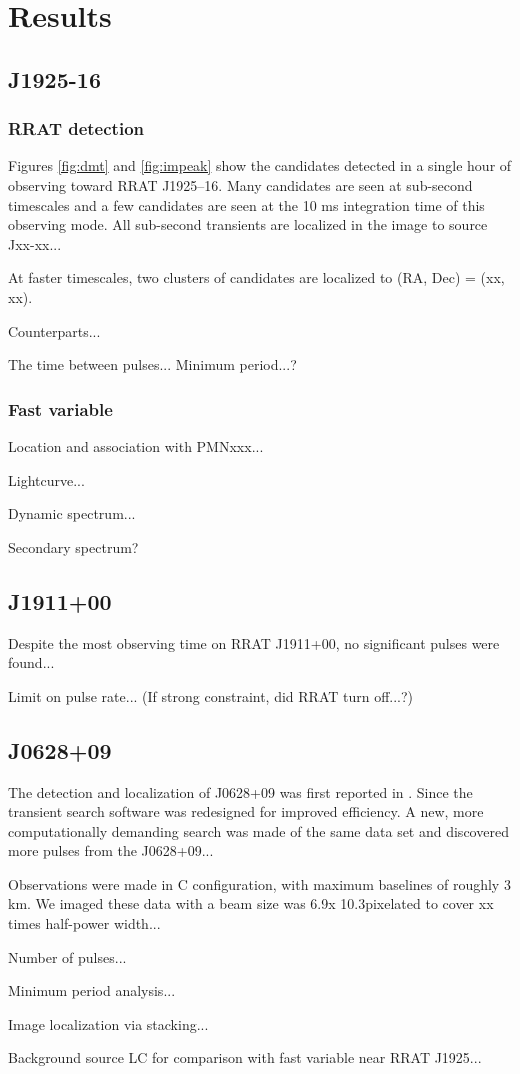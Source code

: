 \section{Results}

\subsection{J1925-16}
\subsubsection{RRAT detection}
\label{rrat1925}

Figures \ref{fig:dmt} and \ref{fig:impeak} show the candidates detected in a single hour of observing toward RRAT J1925--16. Many candidates are seen at sub-second timescales and a few candidates are seen at the 10 ms integration time of this observing mode. All sub-second transients are localized in the image to source Jxx-xx...

At faster timescales, two clusters of candidates are localized to (RA, Dec) = (xx, xx). 

Counterparts...

The time between pulses... Minimum period...?

\subsubsection{Fast variable}
\label{fast}

Location and association with PMNxxx...

Lightcurve...

Dynamic spectrum...

Secondary spectrum?

\subsection{J1911+00}

Despite the most observing time on RRAT J1911+00, no significant pulses were found...

Limit on pulse rate...
(If strong constraint, did RRAT turn off...?)

\subsection{J0628+09}

The detection and localization of J0628+09 was first reported in \cite{Law_2012}. Since the transient search software was redesigned for improved efficiency. A new, more computationally demanding search was made of the same data set and discovered more pulses from the J0628+09...

Observations were made in C configuration, with maximum baselines of roughly 3 km. We imaged these data with a beam size was 6.9\arcsec x 10.3\arcsec pixelated to cover xx times half-power width...

Number of pulses...

Minimum period analysis...

Image localization via stacking...

Background source LC for comparison with fast variable near RRAT J1925...
  
  